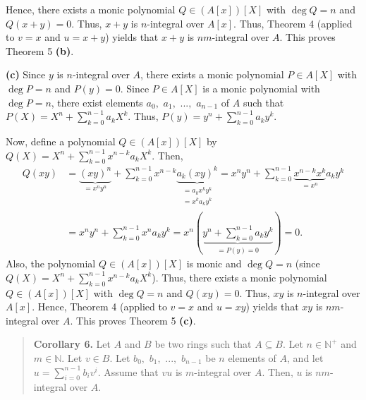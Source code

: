 \documentclass[12pt,final,notitlepage,onecolumn]{article}%
\begin{document}
Hence, there exists a monic polynomial $Q\in\left(  A\left[  x\right]
\right)  \left[  X\right]  $ with $\deg Q=n$ and $Q\left(  x+y\right)  =0$.
Thus, $x+y$ is $n$-integral over $A\left[  x\right]  $. Thus, Theorem 4
(applied to $v=x$ and $u=x+y$) yields that $x+y$ is $nm$-integral over $A$.
This proves Theorem 5 \textbf{(b)}.

\textbf{(c)} Since $y$ is $n$-integral over $A$, there exists a monic
polynomial $P\in A\left[  X\right]  $ with $\deg P=n$ and $P\left(  y\right)
=0$. Since $P\in A\left[  X\right]  $ is a monic polynomial with $\deg P=n$,
there exist elements $a_{0},$ $a_{1},$ $...,$ $a_{n-1}$ of $A$ such that
$P\left(  X\right)  =X^{n}+\sum\limits_{k=0}^{n-1}a_{k}X^{k}$. Thus, $P\left(
y\right)  =y^{n}+\sum\limits_{k=0}^{n-1}a_{k}y^{k}$.

Now, define a polynomial $Q\in\left(  A\left[  x\right]  \right)  \left[
X\right]  $ by $Q\left(  X\right)  =X^{n}+\sum\limits_{k=0}^{n-1}x^{n-k}%
a_{k}X^{k}$. Then,%
\begin{align*}
Q\left(  xy\right)   &  =\underbrace{\left(  xy\right)  ^{n}}_{=x^{n}y^{n}%
}+\sum\limits_{k=0}^{n-1}x^{n-k}\underbrace{a_{k}\left(  xy\right)  ^{k}%
}_{\substack{=a_{k}x^{k}y^{k}\\=x^{k}a_{k}y^{k}}}=x^{n}y^{n}+\sum
\limits_{k=0}^{n-1}\underbrace{x^{n-k}x^{k}}_{=x^{n}}a_{k}y^{k}\\
&  =x^{n}y^{n}+\sum\limits_{k=0}^{n-1}x^{n}a_{k}y^{k}=x^{n}\left(
\underbrace{y^{n}+\sum\limits_{k=0}^{n-1}a_{k}y^{k}}_{=P\left(  y\right)
=0}\right)  =0.
\end{align*}
Also, the polynomial $Q\in\left(  A\left[  x\right]  \right)  \left[
X\right]  $ is monic and $\deg Q=n$ (since $Q\left(  X\right)  =X^{n}%
+\sum\limits_{k=0}^{n-1}x^{n-k}a_{k}X^{k}$). Thus, there exists a monic
polynomial $Q\in\left(  A\left[  x\right]  \right)  \left[  X\right]  $ with
$\deg Q=n$ and $Q\left(  xy\right)  =0$. Thus, $xy$ is $n$-integral over
$A\left[  x\right]  $. Hence, Theorem 4 (applied to $v=x$ and $u=xy$) yields
that $xy$ is $nm$-integral over $A$. This proves Theorem 5 \textbf{(c)}.

\begin{quote}
\textbf{Corollary 6.} Let $A$ and $B$ be two rings such that $A\subseteq B$.
Let $n\in\mathbb{N}^{+}$ and $m\in\mathbb{N}$. Let $v\in B$. Let $b_{0},$
$b_{1},$ $...,$ $b_{n-1}$ be $n$ elements of $A$, and let $u=\sum
\limits_{i=0}^{n-1}b_{i}v^{i}$. Assume that $vu$ is $m$-integral over $A$.
Then, $u$ is $nm$-integral over $A$.
\end{quote}
\end{document}
